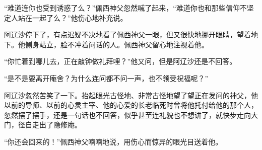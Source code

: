 \par “难道连你也受到诱惑了么？”佩西神父忽然喊了起来，“难道你也和那些信仰不坚定人站在一起了么？”他伤心地补充说。
\par 阿辽沙停下了，有点迟疑不决地看了佩西神父一眼，但又很快地挪开眼睛，望着地下。他侧身站立，脸不冲着问话的人。佩西神父留心地注视着他。
\par “你忙着到哪儿去，正在敲钟做礼拜哩？”他又问，但是阿辽沙还是不回答。
\par “是不是要离开庵舍？为什么连问都不问一声，也不领受祝福呢？”
\par 阿辽沙忽然苦笑了一下。抬起眼光古怪地、非常古怪地望了望正在发问的神父，他以前的导师、以前的心灵主宰、他的心爱的长老临死时曾将他托付给他的那个人，忽然摆了摆手，还是一句话也不回答，似乎甚至连礼貌也不想讲了，就快步走向大门，径自走出了隐修庵。
\par “你还会回来的！”佩西神父喃喃地说，用伤心而惊异的眼光目送着他。
